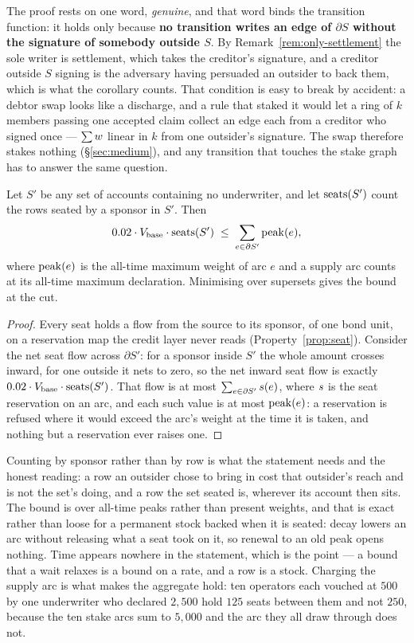 The proof rests on one word, \emph{genuine}, and that word binds the transition function:
it holds only because \textbf{no transition writes an edge of $\partial S$ without the
signature of somebody outside $S$}. By Remark~\ref{rem:only-settlement} the sole writer is
settlement, which takes the creditor's signature, and a creditor outside $S$ signing is
the adversary having persuaded an outsider to back them, which is what the corollary
counts. That condition is easy to break by accident: a debtor swap looks like a discharge,
and a rule that staked it would let a ring of $k$ members passing one accepted claim
collect an edge each from a creditor who signed once --- $\sum w$ linear in $k$ from
one outsider's signature. The swap therefore stakes nothing (\S\ref{sec:medium}), and any
transition that touches the stake graph has to answer the same question.

\begin{corollary}
\label{cor:seats}
Let $S'$ be any set of accounts containing no underwriter, and let $\mathrm{seats}(S')$ count the
rows seated by a sponsor in $S'$. Then
\[
  0.02 \cdot V_{\mathrm{base}} \cdot \mathrm{seats}(S')
  \;\le\; \sum_{e \in \partial S'} \mathrm{peak}(e),
\]
where $\mathrm{peak}(e)$ is the all-time maximum weight of arc $e$ and a supply arc counts at its
all-time maximum declaration. Minimising over supersets gives the bound at the cut.
\end{corollary}

\begin{proof}
Every seat holds a flow from the source to its sponsor, of one bond unit, on a reservation
map the credit layer never reads (Property~\ref{prop:seat}). Consider the net seat flow
across $\partial S'$: for a sponsor inside $S'$ the whole amount crosses inward, for one
outside it nets to zero, so the net inward seat flow is exactly
$0.02 \cdot V_{\mathrm{base}} \cdot \mathrm{seats}(S')$. That flow is at most
$\sum_{e \in \partial S'} s(e)$, where $s$ is the seat reservation on an arc,
and each such value is at most $\mathrm{peak}(e)$: a reservation is refused where it would exceed
the arc's weight at the time it is taken, and nothing but a reservation ever raises one.
\end{proof}

Counting by sponsor rather than by row is what the statement needs and the honest reading:
a row an outsider chose to bring in cost that outsider's reach and is not the set's doing,
and a row the set seated is, wherever its account then sits. The bound is over all-time
peaks rather than present weights, and that is exact rather than loose for a permanent
stock backed when it is seated: decay lowers an arc without releasing what a seat took on
it, so renewal to an old peak opens nothing. Time appears nowhere in the statement, which
is the point --- a bound that a wait relaxes is a bound on a rate, and a row is a stock.
Charging the supply arc is what makes the aggregate hold: ten operators each vouched at
$500$ by one underwriter who declared $2{,}500$ hold $125$ seats between them and not
$250$, because the ten stake arcs sum to $5{,}000$ and the arc they all draw through does
not.

